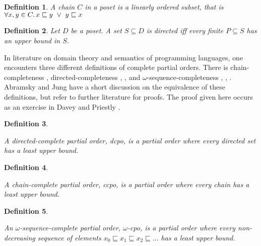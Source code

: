 \documentclass[a4paper]{article}
\newcommand{\below}{\sqsubseteq}
\newcommand{\oor}{\ \vee \ }
\newtheorem{definition}{Definition}[section]
\begin{document}
\begin{definition}

A \emph{chain} $C$ in a poset is a linearly ordered subset, that is $\forall x,y
\in C \ldotp x \below y \oor y \below x$

\end{definition}


\begin{definition}

Let $D$ be a poset. A set $S \subseteq D$ is \emph{directed} iff every finite
$P \subseteq S$ has an upper bound in $S$.

\end{definition}


In literature on domain theory and semantics of programming languages, one
encounters three different definitions of complete partial orders.  There is
chain-completeness \cite{Moschovakis1994}, directed-completeness
\cite{DaveyPriestly1990}, \cite{Gunter1992}, and $\omega$-sequence-completeness
\cite{Allison1986}, \cite{Winskel1993}, \cite{BarrWells1990}. Abramsky and Jung
\cite{Abramsky1994} have a short discussion on the equivalence of these
definitions, but refer to further literature for proofs. The proof given here
occurs as an exercise in Davey and Priestly \cite{DaveyPriestly1990}.


\begin{definition} \label{defCpoDirectedComplete}

A directed-complete partial order, \emph{dcpo}, is a partial order where every
directed set has a least upper bound.

\end{definition}


\begin{definition} \label{defCpoChainComplete}

A chain-complete partial order, \emph{ccpo}, is a partial order where every chain
has a least upper bound.

\end{definition}


\begin{definition} \label{defCpoOmegaSequenceComplete}

An $\omega$-sequence-complete partial order, \emph{$\omega$-cpo}, is a partial
order where every non-decreasing sequence of elements $x_0 \below x_1 \below x_2
\below \ldots $ has a least upper bound.

\end{definition}
\end{document}
